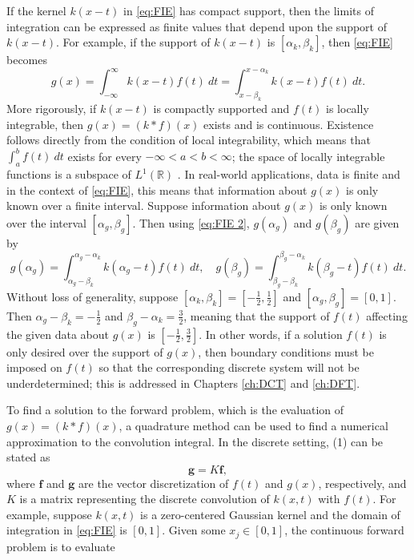 \documentclass[12pt,notitlepage]{report}
\newcommand{\gVec}{\mathbf{g}}	%
\newcommand{\kMat}{K}	%
\newcommand{\fVec}{\mathbf{f}}	%
\begin{document}
If the kernel $k(x-t)$ in \eqref{eq:FIE} has compact support, then the limits of integration can be expressed as finite values that depend upon the support of $k(x-t)$. For example, if the support of $k(x-t)$ is $[\alpha_k,\beta_k]$, then \eqref{eq:FIE} becomes
\begin{equation}
\label{eq:FIE 2}
g(x) = \int_{-\infty}^{\infty} k(x-t)f(t) ~dt = \int_{x-\beta_k}^{x-\alpha_k} k(x-t)f(t) ~dt.
\end{equation} 
More rigorously, if $k(x-t)$ is compactly supported and $f(t)$ is locally integrable, then $g(x) = (k*f)(x)$ exists and is continuous. Existence follows directly from the condition of local integrability, which means that $\int_a^b f(t) ~dt$ exists for every $-\infty < a < b < \infty$; the space of locally integrable functions is a subspace of $L^1(\mathbb{R})$ \cite[p.~63]{DebnathMikusinski2005}. In real-world applications, data is finite and in the context of \eqref{eq:FIE}, this means that information about $g(x)$ is only known over a finite interval. Suppose information about $g(x)$ is only known over the interval $[\alpha_g,\beta_g]$. Then using \eqref{eq:FIE 2}, $g(\alpha_g)$ and $g(\beta_g)$ are given by
\[g(\alpha_g) = \int_{\alpha_g-\beta_k}^{\alpha_g-\alpha_k} k(\alpha_g - t)f(t) ~dt, \quad g(\beta_g) = \int_{\beta_g - \beta_k}^{\beta_g - \alpha_k} k(\beta_g-t)f(t) ~dt.\]
Without loss of generality, suppose $[\alpha_k,\beta_k] = [-\frac{1}{2},\frac{1}{2}]$ and $[\alpha_g,\beta_g] = [0,1]$. Then $\alpha_g-\beta_k = -\frac{1}{2}$ and $\beta_g - \alpha_k = \frac{3}{2}$, meaning that the support of $f(t)$ affecting the given data about $g(x)$ is $[-\frac{1}{2},\frac{3}{2}]$. In other words, if a solution $f(t)$ is only desired over the support of $g(x)$, then boundary conditions must be imposed on $f(t)$ so that the corresponding discrete system will not be underdetermined; this is addressed in Chapters \ref{ch:DCT} and \ref{ch:DFT}. \par 
To find a solution to the forward problem, which is the evaluation of $g(x) = (k * f)(x)$, a quadrature method can be used to find a numerical approximation to the convolution integral. In the discrete setting, (1) can be stated as
\begin{equation}
\gVec = \kMat\fVec,
\label{eq:Dis}
\end{equation}
where $\fVec$ and $\gVec$ are the vector discretization of $f(t)$ and $g(x)$, respectively, and $\kMat$ is a matrix representing the discrete convolution of $k(x,t)$ with $f(t)$. For example, suppose $k(x,t)$ is a zero-centered Gaussian kernel and the domain of integration in \eqref{eq:FIE} is $[0,1]$. Given some $x_j \in [0,1]$, the continuous forward problem is to evaluate
\end{document}
